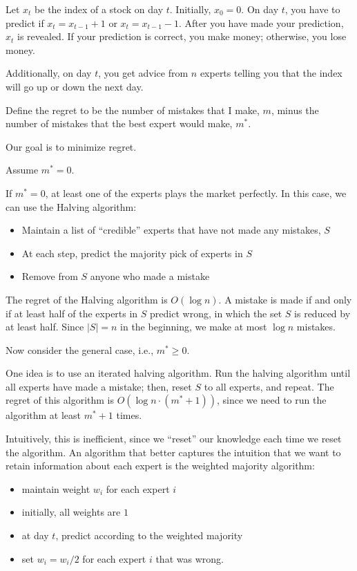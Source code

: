 Let $x_t$ be the index of a stock on day $t$. Initially, $x_0=0$. On day $t$, you have to predict if $x_t = x_{t-1}+1$ or $x_t = x_{t-1}-1$. After you have made your prediction, $x_t$ is revealed. If your prediction is correct, you make money; otherwise, you lose money. 

Additionally, on day $t$, you get advice from $n$ experts telling you that the index will go up or down the next day. 

\begin{definition}

Define the \ac{regret} to be the number of mistakes that I make, $m$, minus the number of mistakes that the best expert would make, $m^*$. 
\end{definition}

Our goal is to minimize regret. 

\begin{example}
\exlabel

Assume $m^*=0$.
\end{example}

If $m^*=0$, at least one of the experts plays the market perfectly. In this case, we can use the \ac{Halving algorithm}:
\begin{itemize}
    \item Maintain a list of ``credible'' experts that have not made any mistakes, $S$
    \item At each step, predict the majority pick of experts in $S$
    \item Remove from $S$ anyone who made a mistake
\end{itemize}

The regret of the Halving algorithm is $O(\log n)$. A mistake is made if and only if at least half of the experts in $S$ predict wrong, in which the set $S$ is reduced by at least half. Since $\vert S\vert = n$ in the beginning, we make at most $\log n$ mistakes. 

\begin{example}
\exlabel

Now consider the general case, i.e., $m^*\geq 0$.
\end{example}

One idea is to use an iterated halving algorithm. Run the halving algorithm until all experts have made a mistake; then, reset $S$ to all experts, and repeat. The regret of this algorithm is $O(\log n\cdot (m^*+1))$, since we need to run the algorithm at least $m^*+1$ times. 

Intuitively, this is inefficient, since we ``reset'' our knowledge each time we reset the algorithm. An algorithm that better captures the intuition that we want to retain information about each expert is the \ac{weighted majority algorithm}:
\begin{itemize}
    \item maintain weight $w_i$ for each expert $i$
    \item initially, all weights are $1$
    \item at day $t$, predict according to the weighted majority 
    \item set $w_i = w_i/2$ for each expert $i$ that was wrong.
\end{itemize}

